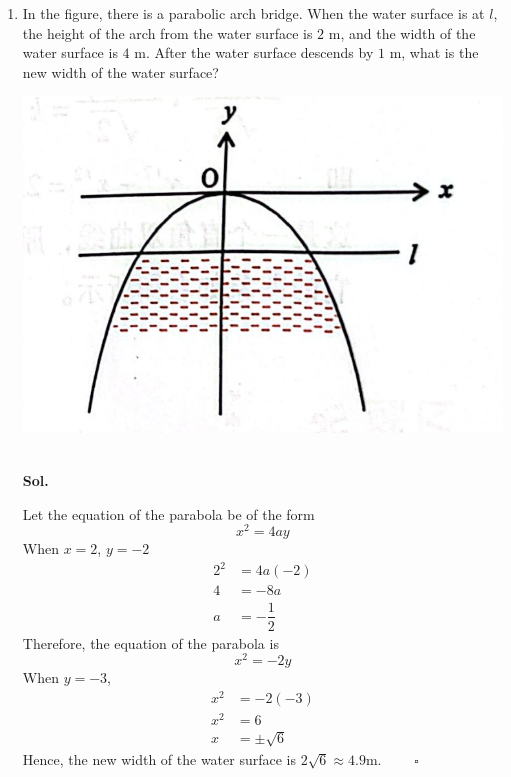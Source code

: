 \documentclass{report}
\newcommand{\sol}{\vspace{1em}\\\textbf{Sol.}}
\newcommand{\eos}{ \qquad \square}
\begin{document}
\begin{enumerate}
          \newpage
    \item In the figure, there is a parabolic arch bridge. When the water surface is at
          $l$, the height of the arch from the water surface is $2$ m, and the width of
          the water surface is $4$ m. After the water surface descends by $1$ m, what is
          the new width of the water surface?
          \begin{center}
              \includegraphics[scale=0.25]{./assets/reex56.png}
          \end{center}
          \ \sol{}

          Let the equation of the parabola be of the form
          \begin{equation*}
              x^2 = 4ay
          \end{equation*}
          When $x = 2$, $y = -2$
          \begin{align*}
              2^2 & = 4a(-2)        \\
              4   & = -8a           \\
              a   & = -\dfrac{1}{2}
          \end{align*}
          Therefore, the equation of the parabola is
          \begin{equation*}
              x^2 = -2y
          \end{equation*}
          When $y = -3$,
          \begin{align*}
              x^2 & = -2(-3)       \\
              x^2 & = 6            \\
              x   & = \pm \sqrt{6}
          \end{align*}
          Hence, the new width of the water surface is $2\sqrt{6} \approx 4.9$m. $\eos$


\end{enumerate}
\end{document}
